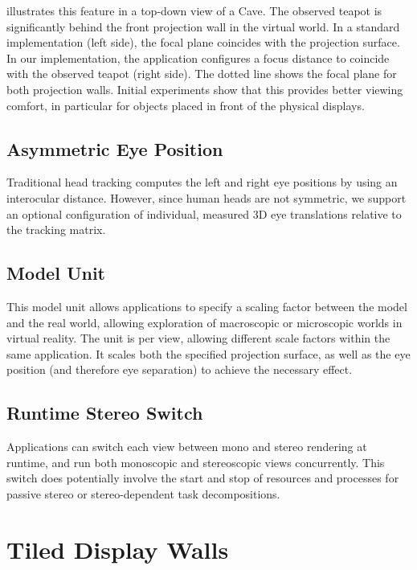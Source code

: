  illustrates this feature in a top-down view of a Cave. The
observed teapot is significantly behind the front projection wall in the
virtual world. In a standard implementation (left side), the focal plane
coincides with the projection surface. In our implementation, the application
configures a focus distance to coincide with the observed teapot (right side).
The dotted line shows the focal plane for both projection walls. Initial
experiments show that this provides better viewing comfort, in particular for
objects placed in front of the physical displays.

\subsection{Asymmetric Eye Position}

Traditional head tracking computes the left and right eye positions by using an
interocular distance. However, since human heads are not symmetric, we support
an optional configuration of individual, measured 3D eye translations relative
to the tracking matrix.

\subsection{Model Unit}

This model unit allows applications to specify a scaling factor between the
model and the real world, allowing exploration of macroscopic or microscopic
worlds in virtual reality. The unit is per view, allowing different scale
factors within the same application. It scales both the specified projection
surface, as well as the eye position (and therefore eye separation) to achieve
the necessary effect.

\subsection{Runtime Stereo Switch}

Applications can switch each view between mono and stereo rendering at runtime,
and run both monoscopic and stereoscopic views concurrently. This switch does
potentially involve the start and stop of resources and processes for passive
stereo or stereo-dependent task decompositions.

\section{Tiled Display Walls}\label{sTIDE}


